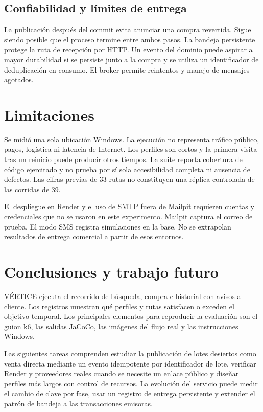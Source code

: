 \documentclass[conference]{IEEEtran}
\begin{document}
\subsection{Confiabilidad y límites de entrega}
La publicación después del commit evita anunciar una compra revertida. Sigue siendo posible que el proceso termine entre ambos pasos. La bandeja persistente protege la ruta de recepción por HTTP. Un evento del dominio puede aspirar a mayor durabilidad si se persiste junto a la compra y se utiliza un identificador de deduplicación en consumo. El broker permite reintentos y manejo de mensajes agotados.

\section{Limitaciones}
Se midió una sola ubicación Windows. La ejecución no representa tráfico público, pagos, logística ni latencia de Internet. Los perfiles son cortos y la primera visita tras un reinicio puede producir otros tiempos. La suite reporta cobertura de código ejercitado y no prueba por sí sola accesibilidad completa ni ausencia de defectos. Las cifras previas de 33 rutas no constituyen una réplica controlada de las corridas de 39.

El despliegue en Render y el uso de SMTP fuera de Mailpit requieren cuentas y credenciales que no se usaron en este experimento. Mailpit captura el correo de prueba. El modo SMS registra simulaciones en la base. No se extrapolan resultados de entrega comercial a partir de esos entornos.

\section{Conclusiones y trabajo futuro}
VÉRTICE ejecuta el recorrido de búsqueda, compra e historial con avisos al cliente. Los registros muestran qué perfiles y rutas satisfacen o exceden el objetivo temporal. Los principales elementos para reproducir la evaluación son el guion k6, las salidas JaCoCo, las imágenes del flujo real y las instrucciones Windows.

Las siguientes tareas comprenden estudiar la publicación de lotes desiertos como venta directa mediante un evento idempotente por identificador de lote, verificar Render y proveedores reales cuando se necesite un enlace público y diseñar perfiles más largos con control de recursos. La evolución del servicio puede medir el cambio de clave por fase, usar un registro de entrega persistente y extender el patrón de bandeja a las transacciones emisoras.
\end{document}
